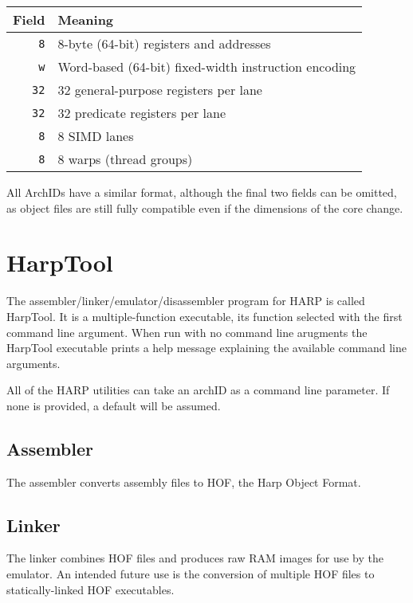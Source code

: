\documentclass[10pt,letterpaper]{article}
\begin{document}
\begin{center}
\begin{tabular}{rl}
\textbf{Field}&\textbf{Meaning}\\
\hline
\texttt{8} &8-byte (64-bit) registers and addresses\\
\texttt{w} &Word-based (64-bit) fixed-width instruction encoding\\
\texttt{32}&32 general-purpose registers per lane\\
\texttt{32}&32 predicate registers per lane\\
\texttt{8} &8 SIMD lanes\\
\texttt{8} &8 warps (thread groups)\\
\end{tabular}
\end{center}

All ArchIDs have a similar format, although the final two fields can be omitted, as object files are still fully compatible even if the dimensions of the core change. 

\section{HarpTool}
The assembler/linker/emulator/disassembler program for HARP is called HarpTool.
It is a multiple-function executable, its function selected with the first command line argument.
When run with no command line arugments the HarpTool executable prints a help message explaining the available command line arguments.

All of the HARP utilities can take an archID as a command line parameter.
If none is provided, a default will be assumed.

\subsection{Assembler}
The assembler converts assembly files to HOF, the Harp Object Format.

\subsection{Linker}
The linker combines HOF files and produces raw RAM images for use by the emulator.
An intended future use is the conversion of multiple HOF files to statically-linked HOF executables.

\end{document}
